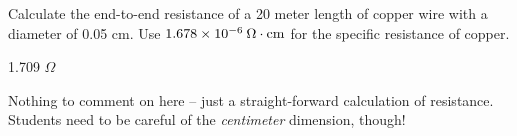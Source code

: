 

Calculate the end-to-end resistance of a 20 meter length of copper wire with a diameter of 0.05 cm.  Use $1.678 \times 10^{-6} \> \Omega \cdot \hbox{cm}$ for the specific resistance of copper.







1.709 $\Omega$







Nothing to comment on here -- just a straight-forward calculation of resistance.  Students need to be careful of the {\it centimeter} dimension, though!




